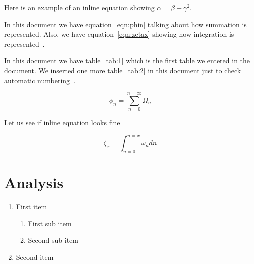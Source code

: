 \documentclass[a4paper, 12pt]{article}
\begin{document}
Here is an example of an inline equation showing $\alpha = \beta + \gamma^2$.

In this document we have equation~\ref{eqn:phin} talking about how summation is represented. Also, we have equation~\ref{eqn:zetax} showing how integration is represented~\cite{dewar}. 

In this document we have table~\ref{tab:1} which is the first table we entered in the document.
We inserted one more table~\ref{tab:2} in this document just to check automatic numbering~\cite{bern}.

\begin{equation}
 \phi_n = \sum_{n=0}^{n=\infty}{ \Omega_n}
	\label{eqn:phin}
\end{equation}

Let us see if inline equation looks fine 

\begin{equation}
\zeta_x = \int_{n=0}^{n=x}{\omega_n dn}  
\label{eqn:zetax}
\end{equation}

\section{Analysis}

\begin{enumerate}
	\item First item
		\begin{enumerate}
			\item First sub item
			\item Second sub item
		\end{enumerate}
	\item Second item
\end{enumerate}
\end{document}
